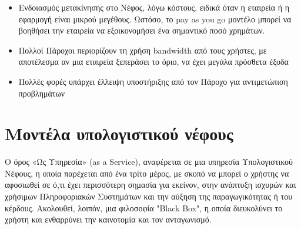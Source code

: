 \documentclass{article}
\begin{document}
\begin{itemize}
\item	Ενδοιασμός μετακίνησης στο Νέφος, λόγω κόστους, ειδικά όταν η εταιρεία ή η εφαρμογή είναι μικρού μεγέθους. Ωστόσο, το pay as you go μοντέλο μπορεί να βοηθήσει την εταιρεία να εξοικονομήσει ένα σημαντικό ποσό χρημάτων.
\item	Πολλοί Πάροχοι περιορίζουν τη χρήση bandwidth από τους χρήστες, με αποτέλεσμα αν μια εταιρεία ξεπεράσει το όριο, να έχει μεγάλα πρόσθετα έξοδα
\item	Πολλές φορές υπάρχει έλλειψη υποστήριξης από τον Πάροχο για αντιμετώπιση προβλημάτων
\end{itemize}










\section{Μοντέλα υπολογιστικού νέφους}
Ο όρος «Ως Υπηρεσία» (as a Service), αναφέρεται σε μια υπηρεσία Υπολογιστικού Νέφους, η οποία παρέχεται από ένα τρίτο μέρος, με σκοπό να μπορεί ο χρήστης να αφοσιωθεί σε ό,τι έχει περισσότερη σημασία για εκείνον, στην ανάπτυξη ισχυρών και χρήσιμων Πληροφοριακών Συστημάτων και την αύξηση της παραγωγικότητας ή του κέρδους. Ακολουθεί, λοιπόν, μια φιλοσοφία "Black Box", η οποία διευκολύνει το χρήστη και ενθαρρύνει την καινοτομία και τον ανταγωνισμό.
\end{document}
